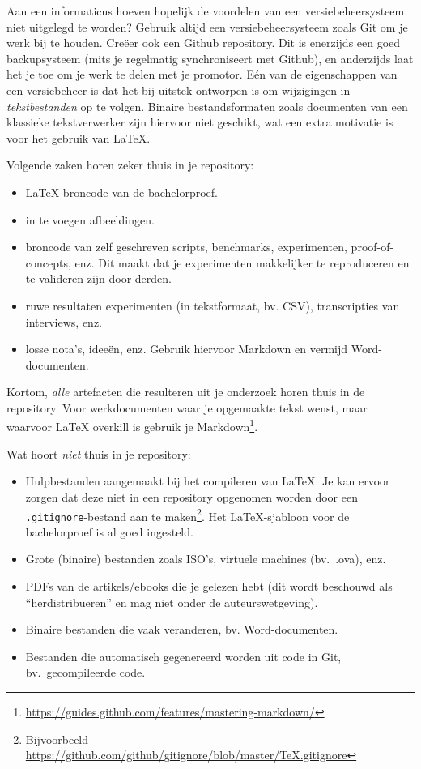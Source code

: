 Aan een informaticus hoeven hopelijk de voordelen van een versiebeheersysteem niet uitgelegd te worden? Gebruik altijd een versiebeheersysteem zoals Git om je werk bij te houden. Creëer ook een Github repository. Dit is enerzijds een goed backupsysteem (mits je regelmatig synchroniseert met Github), en anderzijds laat het je toe om je werk te delen met je promotor. Eén van de eigenschappen van een versiebeheer is dat het bij uitstek ontworpen is om wijzigingen in \emph{tekstbestanden} op te volgen. Binaire bestandsformaten zoals documenten van een klassieke tekstverwerker zijn hiervoor niet geschikt, wat een extra motivatie is voor het gebruik van \LaTeX{}.

Volgende zaken horen zeker thuis in je repository:

\begin{itemize}
  \item \LaTeX{}-broncode van de bachelorproef.
  \item in te voegen afbeeldingen.
  \item broncode van zelf geschreven scripts, benchmarks, experimenten, proof-of-concepts, enz. Dit maakt dat je experimenten makkelijker te reproduceren en te valideren zijn door derden.
  \item ruwe resultaten experimenten (in tekstformaat, bv. CSV), transcripties van interviews, enz.
  \item losse nota's, ideeën, enz. Gebruik hiervoor Markdown en vermijd Word-do\-cu\-men\-ten.
\end{itemize}

Kortom, \emph{alle} artefacten die resulteren uit je onderzoek horen thuis in de repository. Voor werkdocumenten waar je opgemaakte tekst wenst, maar waarvoor \LaTeX{} overkill is gebruik je Markdown\footnote{\url{https://guides.github.com/features/mastering-markdown/}}.

Wat hoort \emph{niet} thuis in je repository:

\begin{itemize}
  \item Hulpbestanden aangemaakt bij het compileren van \LaTeX{}. Je kan ervoor zorgen dat deze niet in een repository opgenomen worden door een \texttt{.gitignore}-bestand aan te maken\footnote{Bijvoorbeeld \url{https://github.com/github/gitignore/blob/master/TeX.gitignore}}. Het \LaTeX{}-sjabloon voor de bachelorproef is al goed ingesteld.
  \item Grote (binaire) bestanden zoals ISO's, virtuele machines (bv.\ .ova), enz.
  \item PDFs van de artikels/ebooks die je gelezen hebt (dit wordt beschouwd als ``herdistribueren'' en mag niet onder de auteurswetgeving).
  \item Binaire bestanden die vaak veranderen, bv. Word-documenten.
  \item Bestanden die automatisch gegenereerd worden uit code in Git, bv.\ gecompileerde code.
\end{itemize}

